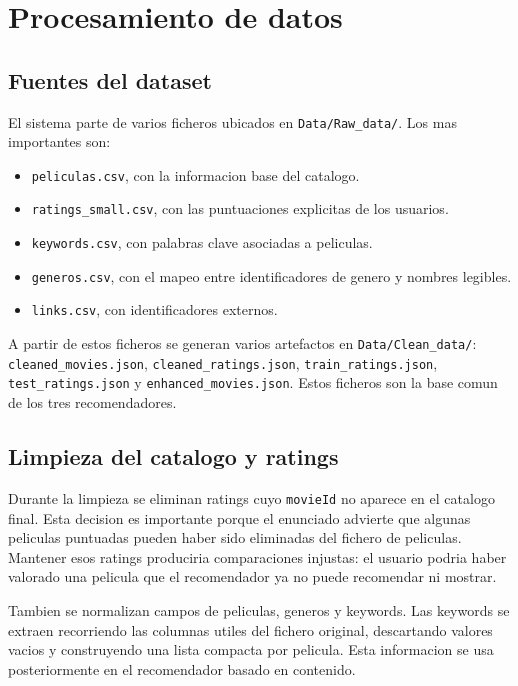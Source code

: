 \documentclass[12pt,a4paper]{article}
\begin{document}
\section{Procesamiento de datos}

\subsection{Fuentes del dataset}

El sistema parte de varios ficheros ubicados en \texttt{Data/Raw\_data/}. Los mas importantes son:

\begin{itemize}[leftmargin=*]
\item \texttt{peliculas.csv}, con la informacion base del catalogo.
\item \texttt{ratings\_small.csv}, con las puntuaciones explicitas de los usuarios.
\item \texttt{keywords.csv}, con palabras clave asociadas a peliculas.
\item \texttt{generos.csv}, con el mapeo entre identificadores de genero y nombres legibles.
\item \texttt{links.csv}, con identificadores externos.
\end{itemize}

A partir de estos ficheros se generan varios artefactos en \texttt{Data/Clean\_data/}: \texttt{cleaned\_movies.json}, \texttt{cleaned\_ratings.json}, \texttt{train\_ratings.json}, \texttt{test\_ratings.json} y \texttt{enhanced\_movies.json}. Estos ficheros son la base comun de los tres recomendadores.

\subsection{Limpieza del catalogo y ratings}

Durante la limpieza se eliminan ratings cuyo \texttt{movieId} no aparece en el catalogo final. Esta decision es importante porque el enunciado advierte que algunas peliculas puntuadas pueden haber sido eliminadas del fichero de peliculas. Mantener esos ratings produciria comparaciones injustas: el usuario podria haber valorado una pelicula que el recomendador ya no puede recomendar ni mostrar.

Tambien se normalizan campos de peliculas, generos y keywords. Las keywords se extraen recorriendo las columnas utiles del fichero original, descartando valores vacios y construyendo una lista compacta por pelicula. Esta informacion se usa posteriormente en el recomendador basado en contenido.
\end{document}
